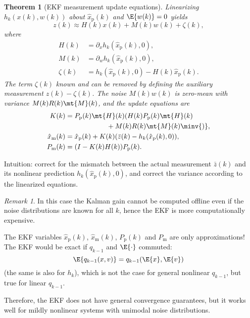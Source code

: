 \documentclass[]{hsrzf}
\theoremstyle{plain}
\newtheorem{thm}{Theorem}[section]
\theoremstyle{definition}
\theoremstyle{remark}
\newtheorem*{remark}{Remark}
\begin{document}
\begin{thm}[EKF measurement update equations]
  Linearizing $h_k(x(k), w(k))$ about $\hat{x}_\mathrm{p}(k)$ and $\E{w(k)} =
  0$ yields
  \[
    z(k) \approx H(k) x(k) + M(k) w(k) + \zeta(k),
  \]
  where
  \begin{align*}
    H(k) &= \partial_x h_{k}(\hat{x}_\mathrm{p}(k), 0), \\
    M(k) &= \partial_w h_{k}(\hat{x}_\mathrm{p}(k), 0), \\
    \zeta(k) &= h_k(\hat{x}_\mathrm{p}(k), 0) - H(k) \hat{x}_\mathrm{p}(k).
  \end{align*}
  The term $\zeta(k)$ known and can be removed by defining the auxiliary
  measurement $z(k) - \zeta(k)$. The noise $M(k)w(k)$ is zero-mean with
  variance $M(k)R(k)\mt{M}(k)$, and the update equations are
  \begin{align*}
    K(k) &= P_\mathrm{p}(k) \mt{H}(k) (
        H(k) P_\mathrm{p}(k) \mt{H}(k) \\
        &\qquad\qquad\qquad + M(k) R(k) \mt{M}(k) \minv{)}, \\
    \hat{x}_\mathrm{m}(k) &= \hat{x}_\mathrm{p}(k) + K(k) (
        \bar{z}(k) - h_k(\hat{x}_\mathrm{p}(k), 0)), \\
    P_\mathrm{m}(k) &= (I - K(k)H(k)) P_\mathrm{p}(k).
  \end{align*}
\end{thm}

Intuition: correct for the mismatch between the actual measurement
$\bar{z}(k)$ and its nonlinear prediction $h_k(\hat{x}_\mathrm{p}(k), 0)$,
and correct the variance according to the linearized equations.

\begin{remark}
  In this case the Kalman gain cannot be computed offline even if the noise
  distributions are known for all $k$, hence the EKF is more computationally
  expensive.
\end{remark}

The EKF variables $\hat{x}_\mathrm{p}(k)$, $\hat{x}_\mathrm{m}(k)$,
$P_\mathrm{p}(k)$ and $P_\mathrm{m}$ are only approximations! The EKF would be
exact if $q_{k-1}$ and $\E{\cdot}$ commuted:
\[
  \E{q_{k-1}(x, v)} = q_{k-1}(\E{x}, \E{v})
\]
(the same is also for $h_k$), which is not the case for general nonlinear
$q_{k-1}$, but true for linear $q_{k-1}$.

Therefore, the EKF does not have general convergence guarantees, but it works
well for mildly nonlinear systems with unimodal noise distributions.
\end{document}
